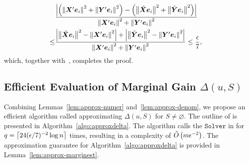 \documentclass[10pt,twocolumn,twoside]{IEEEtran}
\begin{document}
\begin{IEEEproof}
    \begin{align*}
            & \frac{\left|\left( \left\Vert\boldsymbol{X}'\boldsymbol{e}_i\right\Vert^2+\left\Vert\boldsymbol{Y}'\boldsymbol{e}_i\right\Vert^2 \right)-\left( \left\Vert\tilde{\boldsymbol{X}}\boldsymbol{e}_i\right\Vert^2+\left\Vert\tilde{\boldsymbol{Y}}\boldsymbol{e}_i\right\Vert^2 \right) \right|}{\left\Vert\boldsymbol{X}'\boldsymbol{e}_i\right\Vert^2+\left\Vert\boldsymbol{Y}'\boldsymbol{e}_i\right\Vert^2}             \\
        \le & \frac{\left|\left\Vert\tilde{\boldsymbol{X}}\boldsymbol{e}_i\right\Vert^2-\left\Vert\boldsymbol{X}'\boldsymbol{e}_i\right\Vert^2 \right|+\left|\left\Vert\tilde{\boldsymbol{Y}}\boldsymbol{e}_i\right\Vert^2-\left\Vert\boldsymbol{Y}'\boldsymbol{e}_i\right\Vert^2 \right|}{\left\Vert\boldsymbol{X}'\boldsymbol{e}_i\right\Vert^2+\left\Vert\boldsymbol{Y}'\boldsymbol{e}_i\right\Vert^2}\le\frac{\epsilon}{7},
    \end{align*}
    which, together with~, completes the proof.
\end{IEEEproof}



\subsection{Efficient Evaluation of Marginal Gain \(\Delta(u,S)\)}

Combining Lemmas~\ref{lem:approx-numer} and~\ref{lem:approx-denom}, we propose an efficient algorithm called  approximating \(\Delta(u,S)\) for  \(S\neq\varnothing\). The outline of   is presented in Algorithm~\ref{algo:approxdelta}. The  algorithm calls the \(\mathtt{Solver}\) in  for \(q=\left\lceil24(\epsilon/7)^{-2}\log n\right\rceil\) times, resulting in a complexity of \(\tilde{O}\left( m\epsilon^{-2} \right)\). The approximation guarantee for Algorithm~\ref{algo:approxdelta} is provided in
Lemma~\ref{lem:approx-marginest}.
\end{document}
